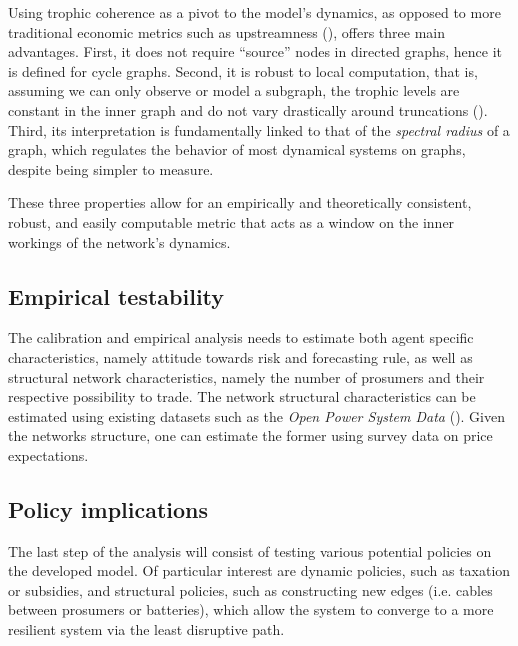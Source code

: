 \documentclass[american]{scrartcl}
\begin{document}
Using trophic coherence as a pivot to the model's dynamics, as opposed to more traditional economic metrics such as upstreamness (\cite{Antrs2012}), offers three main advantages. First, it does not require ``source'' nodes in directed graphs, hence it is defined for cycle graphs. Second, it is robust to local computation, that is, assuming we can only observe or model a subgraph, the trophic levels are constant in the inner graph and do not vary drastically around truncations (\cite[p.~19]{MacKay2020}). Third, its interpretation is fundamentally linked to that of the \textit{spectral radius} of a graph, which regulates the behavior of most dynamical systems on graphs, despite being simpler to measure.

These three properties allow for an empirically and theoretically consistent, robust, and easily computable metric that acts as a window on the inner workings of the network's dynamics.


\subsection{Empirical testability}

The calibration and empirical analysis needs to estimate both agent specific characteristics, namely attitude towards risk and forecasting rule, as well as structural network characteristics, namely the number of prosumers and their respective possibility to trade. The network structural characteristics can be estimated using existing datasets such as the \textit{Open Power System Data} (\cite{Wiese2019}). Given the networks structure, one can estimate the former using survey data on price expectations.


\subsection{Policy implications}

The last step of the analysis will consist of testing various potential policies on the developed model. Of particular interest are dynamic policies, such as taxation or subsidies, and structural policies, such as constructing new edges (i.e. cables between prosumers or batteries), which allow the system to converge to a more resilient system via the least disruptive path.


\newpage
{} %

\printbibliography
\end{document}
